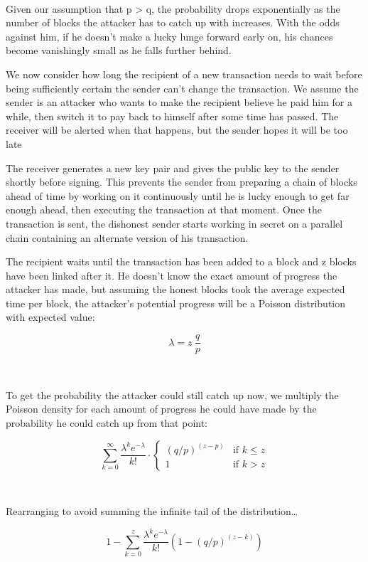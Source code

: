 \documentclass[a4paper, 10pt]{article}
\begin{document}
\

Given our assumption that p \textgreater{} q, the probability drops
exponentially as the number of blocks the attacker has to catch up with
increases. With the odds against him, if he doesn't make a lucky lunge
forward early on, his chances become vanishingly small as he falls
further behind.

We now consider how long the recipient of a new transaction needs to
wait before being sufficiently certain the sender can't change the
transaction. We assume the sender is an attacker who wants to make the
recipient believe he paid him for a while, then switch it to pay back to
himself after some time has passed. The receiver will be alerted when
that happens, but the sender hopes it will be too late

The receiver generates a new key pair and gives the public key to the
sender shortly before signing. This prevents the sender from preparing a
chain of blocks ahead of time by working on it continuously until he is
lucky enough to get far enough ahead, then executing the transaction at
that moment. Once the transaction is sent, the dishonest sender starts
working in secret on a parallel chain containing an alternate version of
his transaction.

The recipient waits until the transaction has been added to a block and
z blocks have been linked after it. He doesn't know the exact amount of
progress the attacker has made, but assuming the honest blocks took the
average expected time per block, the attacker's potential progress will
be a Poisson distribution with expected value:

\[\lambda = z \ \frac{q}{p}\]

\

To get the probability the attacker could still catch up now, we
multiply the Poisson density for each amount of progress he could have
made by the probability he could catch up from that point:

\[\sum _{k=0}^\infty \frac{\lambda ^k e^{-\lambda}}{k!} \cdot 
\begin{cases}
    \left(q/p\right)^{(z-p)} & \text{if } k \leqslant z \\
    1                     & \text{if } k > z
\end{cases}
\]

\

Rearranging to avoid summing the infinite tail of the
distribution\ldots{}

\[1 - \sum _{k=0}^z \frac{\lambda ^k e^{-\lambda}}{k!} \left(1 - \left(q/p\right)^{(z-k)}\right)\]
\end{document}
